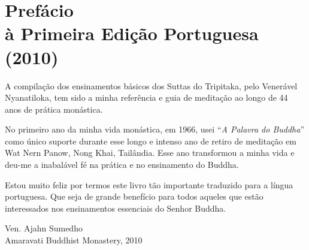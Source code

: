 \chapter[Prefácio à Primeira Edição Portuguesa (2010)]{Prefácio\\ à Primeira Edição Portuguesa\\ (2010)}

A compilação dos ensinamentos básicos dos Suttas do Tripitaka, pelo Venerável
Nyanatiloka, tem sido a minha referência e guia de meditação ao longo de 44 anos
de prática monástica.

No primeiro ano da minha vida monástica, em 1966, usei ``\emph{A Palavra do
  Buddha}'' como único suporte durante esse longo e intenso ano de retiro de
meditação em Wat Nern Panow, Nong Khai, Tailândia. Esse ano transformou a minha
vida e deu-me a inabalável fé na prática e no ensinamento do Buddha.

Estou muito feliz por termos este livro tão importante traduzido para a língua
portuguesa. Que seja de grande benefício para todos aqueles que estão
interessados nos ensinamentos essenciais do Senhor Buddha.

\bigskip

{\raggedleft
  Ven. Ajahn Sumedho\\
  Amaravati Buddhist Monastery, 2010
\par}

